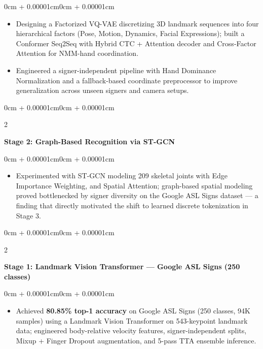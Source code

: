 \documentclass[10pt, letterpaper]{article}
\newenvironment{highlights}{
    \begin{itemize}[
        topsep=0.08cm, parsep=0.08cm,
        partopsep=0pt, itemsep=0pt,
        leftmargin=0cm + 10pt
    ]
}{\end{itemize}}
\newenvironment{onecolentry}{
    \begin{adjustwidth}{0cm + 0.00001cm}{0cm + 0.00001cm}
}{\end{adjustwidth}}
\newenvironment{twocolentry}[2][]{
    \onecolentry
    \def\secondColumn{#2}
    \setcolumnwidth{\fill, 4.5cm}
    \begin{paracol}{2}
}{
    \switchcolumn \raggedleft \secondColumn
    \end{paracol}
    \endonecolentry
}
\begin{document}
\vspace{0.08cm}
\begin{onecolentry}
    \begin{highlights}
        \item Designing a Factorized VQ-VAE discretizing 3D landmark sequences into four hierarchical factors (Pose, Motion, Dynamics, Facial Expressions); built a Conformer Seq2Seq with Hybrid CTC + Attention decoder and Cross-Factor Attention for NMM-hand coordination. %
        \item Engineered a signer-independent pipeline with Hand Dominance Normalization and a fallback-based coordinate preprocessor to improve generalization across unseen signers and camera setups.
    \end{highlights}
\end{onecolentry}

\vspace{0.12cm}

\begin{twocolentry}{2025}
    \textbf{Stage 2: Graph-Based Recognition via ST-GCN}
\end{twocolentry}
 
\vspace{0.08cm}
\begin{onecolentry}
    \begin{highlights}
        \item Experimented with ST-GCN modeling 209 skeletal joints with Edge Importance Weighting, and Spatial Attention; graph-based spatial modeling proved bottlenecked by signer diversity on the Google ASL Signs dataset --- a finding that directly motivated the shift to learned discrete tokenization in Stage 3.
    \end{highlights}
\end{onecolentry}

\vspace{0.12cm}

\begin{twocolentry}{2024}
    \textbf{Stage 1: Landmark Vision Transformer --- Google ASL Signs (250 classes)}
\end{twocolentry}
 
\vspace{0.08cm}
\begin{onecolentry}
    \begin{highlights}
        \item Achieved \textbf{80.85\% top-1 accuracy} on Google ASL Signs (250 classes, 94K samples) using a Landmark Vision Transformer on 543-keypoint landmark data; engineered body-relative velocity features, signer-independent splits, Mixup + Finger Dropout augmentation, and 5-pass TTA ensemble inference.
    \end{highlights}
\end{onecolentry}
\end{document}
